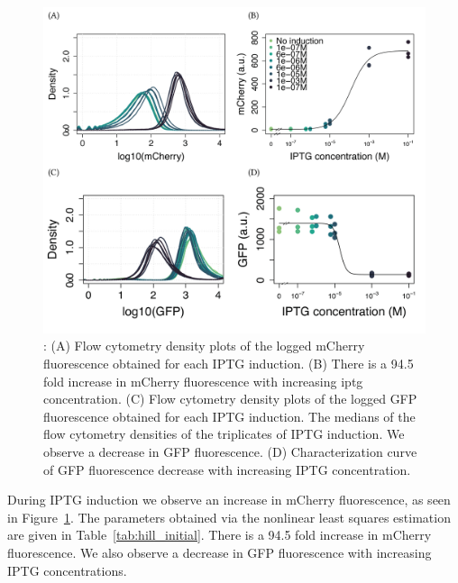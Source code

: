 


\begin{figure}[tb]
	\begin{center}
\includegraphics[width=\textwidth]{../../chapters/chapterABCFlow/images/pKDL071_concentrations_model_fit-01.png}
\caption[Characterisation of pKDL071 after \acrshort{iptg} induction]{\label{fig:switch_concentrations_model}:  (A) Flow cytometry density plots of the logged mCherry fluorescence obtained for each IPTG induction. (B) There is a 94.5 fold increase in mCherry fluorescence with increasing \acrshort{iptg} concentration. (C) Flow cytometry density plots of the logged GFP fluorescence obtained for each IPTG induction. The medians of the flow cytometry densities of the triplicates of IPTG induction. We observe a decrease in GFP fluorescence. (D) Characterization curve of GFP fluorescence decrease with increasing IPTG concentration.}
\end{center}
\end{figure}


During IPTG induction we observe an increase in mCherry fluorescence, as seen in Figure~\ref{fig:switch_concentrations_model}. The parameters obtained via the nonlinear least squares estimation are given in Table~\ref{tab:hill_initial}. There is a 94.5 fold increase in mCherry fluorescence.  We also observe a decrease in GFP fluorescence with increasing IPTG concentrations. 


